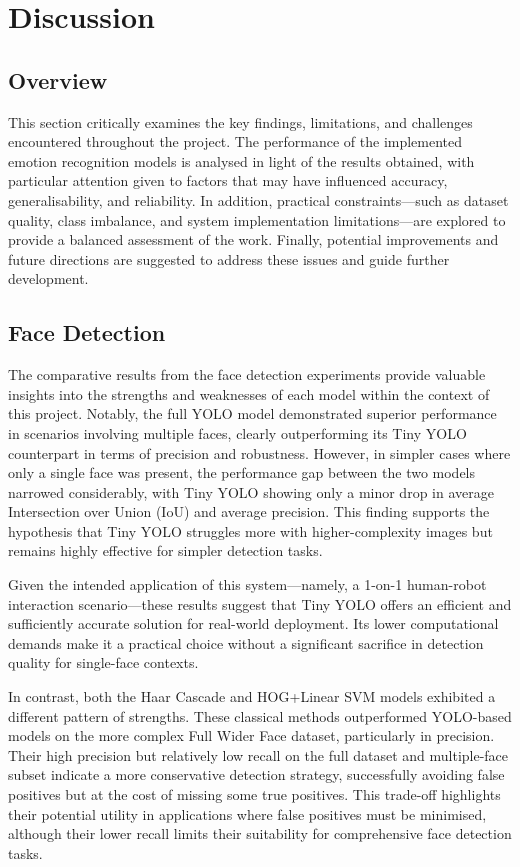 \chapter{Discussion}

\section{Overview}
This section critically examines the key findings, limitations, and challenges encountered throughout the project. The performance of the implemented emotion recognition models is analysed in light of the results obtained, with particular attention given to factors that may have influenced accuracy, generalisability, and reliability. In addition, practical constraints—such as dataset quality, class imbalance, and system implementation limitations—are explored to provide a balanced assessment of the work. Finally, potential improvements and future directions are suggested to address these issues and guide further development.

\section{Face Detection}

The comparative results from the face detection experiments provide valuable insights into the strengths and weaknesses of each model within the context of this project. Notably, the full YOLO model demonstrated superior performance in scenarios involving multiple faces, clearly outperforming its Tiny YOLO counterpart in terms of precision and robustness. However, in simpler cases where only a single face was present, the performance gap between the two models narrowed considerably, with Tiny YOLO showing only a minor drop in average Intersection over Union (IoU) and average precision. This finding supports the hypothesis that Tiny YOLO struggles more with higher-complexity images but remains highly effective for simpler detection tasks.

Given the intended application of this system—namely, a 1-on-1 human-robot interaction scenario—these results suggest that Tiny YOLO offers an efficient and sufficiently accurate solution for real-world deployment. Its lower computational demands make it a practical choice without a significant sacrifice in detection quality for single-face contexts.

In contrast, both the Haar Cascade and HOG+Linear SVM models exhibited a different pattern of strengths. These classical methods outperformed YOLO-based models on the more complex Full Wider Face dataset, particularly in precision. Their high precision but relatively low recall on the full dataset and multiple-face subset indicate a more conservative detection strategy, successfully avoiding false positives but at the cost of missing some true positives. This trade-off highlights their potential utility in applications where false positives must be minimised, although their lower recall limits their suitability for comprehensive face detection tasks.

